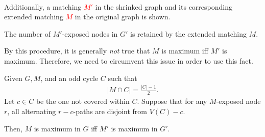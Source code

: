 \begin{example}
\begin{minipage}{\textwidth}
\begin{minipage}{0.4\textwidth}
        \end{minipage}
    \end{minipage}
    \vspace{5pt}
    \\
    Additionally, a matching \textcolor{red}{$M'$} in the shrinked graph and its corresponding
    extended matching \textcolor{red}{$M$} in the original graph is shown.
\end{example}
\begin{observe}
    The number of $M'$-exposed nodes in $G'$ is retained by the extended matching $M$.
\end{observe}
\begin{warning}
    By this procedure, it is generally \emph{not} true that $M$ is maximum iff $M'$ is maximum.
    Therefore, we need to circumvent this issue in order to use this fact.
\end{warning}
\begin{theorem} \label{thm:cycle-shrinking}
    Given $G,M$, and an odd cycle $C$ such that
    \begin{align*}
        |M \cap C| = \frac{|C|-1}{2}.
    \end{align*}
    Let $c \in C$ be the one not covered within $C$. Suppose that for any $M$-exposed
    node $r$, all alternating $r-c$-paths are disjoint from $V(C)-c$.

    Then, $M$ is maximum in $G$ iff $M'$ is maximum in $G'$.
\end{theorem}
